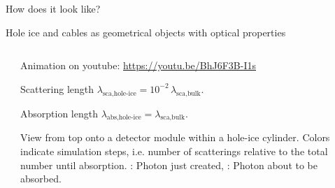 
\begin{frame}[fragile]{How does it look like?}

  Hole ice and cables as geometrical objects with optical properties

  \vspace{1cm}
  \begin{columns}
    \begin{column}{0.5\textwidth}


    \end{column}
    \begin{column}{0.5\textwidth}


      \vspace{1em}
      Animation on youtube: \url{https://youtu.be/BhJ6F3B-I1s}

      \scriptsize
      \vspace{1em}
      Scattering length $\lambda_\text{sca,hole-ice} = 10^{-2}\, \lambda_\text{sca,bulk}$.

      Absorption length $\lambda_\text{abs,hole-ice} = \lambda_\text{sca,bulk}$.

      \vspace{1em}
      \tiny{View from top onto a detector module within a hole-ice cylinder. Colors indicate simulation steps, i.e. number of scatterings relative to the total number until absorption. \color{red}{Red}: Photon just created, \color{blue}{blue}: Photon about to be absorbed.}

    \end{column}
  \end{columns}


\end{frame}

